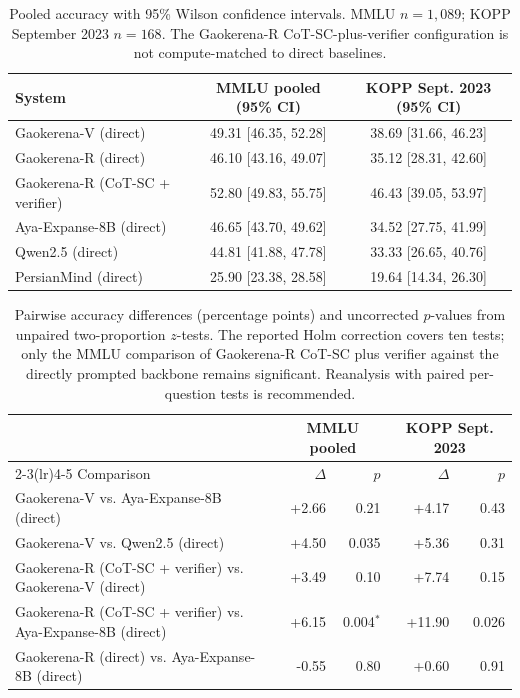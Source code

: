 \documentclass[manuscript,screen,review]{acmart}
\begin{document}
\begin{table}[ht]
\caption{Pooled accuracy with 95\% Wilson confidence intervals. MMLU $n=1,089$; KOPP September 2023 $n=168$. The Gaokerena-R CoT-SC-plus-verifier configuration is not compute-matched to direct baselines.}\label{tab:ci}
\small
\begin{tabular}{@{}lcc@{}}
\toprule
System & MMLU pooled (95\% CI) & KOPP Sept. 2023 (95\% CI) \\
\midrule
Gaokerena-V (direct) & 49.31 [46.35, 52.28] & 38.69 [31.66, 46.23] \\
Gaokerena-R (direct) & 46.10 [43.16, 49.07] & 35.12 [28.31, 42.60] \\
Gaokerena-R (CoT-SC + verifier) & 52.80 [49.83, 55.75] & 46.43 [39.05, 53.97] \\
Aya-Expanse-8B (direct) & 46.65 [43.70, 49.62] & 34.52 [27.75, 41.99] \\
Qwen2.5 (direct) & 44.81 [41.88, 47.78] & 33.33 [26.65, 40.76] \\
PersianMind (direct) & 25.90 [23.38, 28.58] & 19.64 [14.34, 26.30] \\
\bottomrule
\end{tabular}
\end{table}

\begin{table}[ht]
\caption{Pairwise accuracy differences (percentage points) and uncorrected $p$-values from unpaired two-proportion $z$-tests. The reported Holm correction covers ten tests; only the MMLU comparison of Gaokerena-R CoT-SC plus verifier against the directly prompted backbone remains significant. Reanalysis with paired per-question tests is recommended.}\label{tab:significance}
\small
\begin{tabular}{@{}lrrrr@{}}
\toprule
 & \multicolumn{2}{c}{MMLU pooled} & \multicolumn{2}{c}{KOPP Sept. 2023} \\
\cmidrule(lr){2-3}\cmidrule(lr){4-5}
Comparison & $\Delta$ & $p$ & $\Delta$ & $p$ \\
\midrule
Gaokerena-V vs. Aya-Expanse-8B (direct) & +2.66 & 0.21 & +4.17 & 0.43 \\
Gaokerena-V vs. Qwen2.5 (direct) & +4.50 & 0.035 & +5.36 & 0.31 \\
Gaokerena-R (CoT-SC + verifier) vs. Gaokerena-V (direct) & +3.49 & 0.10 & +7.74 & 0.15 \\
Gaokerena-R (CoT-SC + verifier) vs. Aya-Expanse-8B (direct) & +6.15 & 0.004$^{*}$ & +11.90 & 0.026 \\
Gaokerena-R (direct) vs. Aya-Expanse-8B (direct) & -0.55 & 0.80 & +0.60 & 0.91 \\
\bottomrule
\end{tabular}
\end{table}
\end{document}
